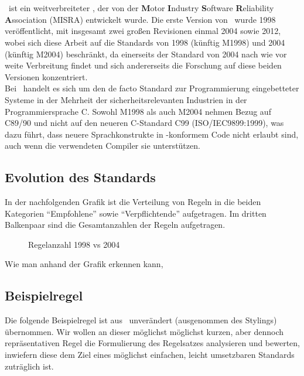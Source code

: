 \documentclass[a4paper,UKenglish,cleveref, autoref]{templates/lipics-v2019}
\begin{document}
    \section{\misra}
    \label{sec:misra-c}
    \misra\ ist ein weitverbreiteter \sqs, der von der \textbf{M}otor \textbf{I}ndustry \textbf{S}oftware \textbf{R}eliability \textbf{A}ssociation (MISRA) entwickelt wurde.
    Die erste Version von \misra\ wurde 1998 veröffentlicht, mit insgesamt zwei großen Revisionen einmal 2004 sowie 2012,
    wobei sich diese Arbeit auf die Standards von 1998 (künftig M1998) und 2004 (künftig M2004) beschränkt, da einerseits der Standard von 2004 nach wie vor
    weite Verbreitung findet und sich andererseits die Forschung auf diese beiden Versionen konzentriert.\\
    Bei \misra\ handelt es sich um den de facto Standard zur Programmierung eingebetteter Systeme in der Mehrheit der sicherheitsrelevanten Industrien in der Programmiersprache C\@.\cite{misra-website}
    Sowohl M1998 als auch M2004 nehmen Bezug auf C89/90 und nicht auf den neueren C-Standard C99 (ISO/IEC9899:1999), was dazu führt, dass neuere Sprachkonstrukte in
    \misra-konformem Code nicht erlaubt sind, auch wenn die verwendeten Compiler sie unterstützen.

    \subsection{Evolution des Standards}
    \label{subsec:evolution-des-standards}
    In der nachfolgenden Grafik ist die Verteilung von Regeln in die beiden Kategorien \enquote{Empfohlene} sowie
    \enquote{Verpflichtende} aufgetragen.
    Im dritten Balkenpaar sind die Gesamtanzahlen der Regeln aufgetragen.

    \begin{figure}[H]
        \centering
        \captionsetup{justification=centering,margin=2cm}
        
        \caption{Regelanzahl 1998 vs 2004}
    \end{figure}

    Wie man anhand der Grafik erkennen kann,

    \subsection{Beispielregel}
    \label{subsec:beispielregel}

    Die folgende Beispielregel ist aus \misra\ unverändert (ausgenommen des Stylings) übernommen.
    Wir wollen an dieser möglichst möglichst kurzen, aber dennoch repräsentativen Regel die Formulierung des Regelsatzes
    analysieren und bewerten, inwiefern diese dem Ziel eines möglichst einfachen, leicht umsetzbaren Standards zuträglich ist.\\
\end{document}
